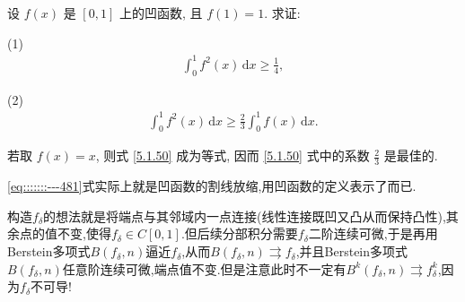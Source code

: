 \documentclass[../../main.tex]{subfiles}%
\begin{document}
\begin{example}
设 \( f(x) \) 是 \([0,1]\) 上的凹函数, 且 \( f(1) = 1 \). 求证:

(1)\begin{align}
\int_{0}^{1} f^2(x) \, \mathrm{d}x \geqslant \frac{1}{4}, \label{5.1.49}
\end{align}

(2)\begin{align}
\int_{0}^{1} f^2(x) \, \mathrm{d}x \geqslant \frac{2}{3} \int_{0}^{1} f(x) \, \mathrm{d}x. \label{5.1.50}
\end{align}
\end{example}
\begin{remark}
若取 \( f(x) = x \), 则式 \eqref{5.1.50} 成为等式, 因而 \eqref{5.1.50} 式中的系数 \( \frac{2}{3} \) 是最佳的.
\end{remark}
\begin{remark}
\eqref{eq:::::::---481}式实际上就是凹函数的割线放缩,用凹函数的定义表示了而已.
\end{remark}
\begin{note}
构造$f_\delta$的想法就是将端点与其邻域内一点连接(线性连接既凹又凸从而保持凸性),其余点的值不变,使得$f_\delta\in C[0,1]$.但后续分部积分需要$f_\delta$二阶连续可微,于是再用Berstein多项式$B(f_\delta,n)$逼近$f_\delta$,从而$B(f_{\delta},n)\rightrightarrows f_{\delta}$,并且Berstein多项式$B(f_\delta,n)$任意阶连续可微,端点值不变.但是注意此时不一定有$B^k(f_{\delta},n)\rightrightarrows f_{\delta}^{k}$,因为$f_\delta$不可导!
\end{note}
\end{document}
